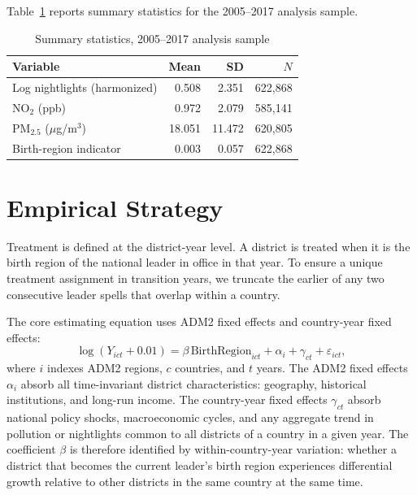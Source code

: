 \documentclass[9pt,twocolumn,twoside]{pnas-new}
\begin{document}
Table~\ref{tab:sumstats} reports summary statistics for the 2005--2017 analysis sample.

\begin{table}[t]
\centering
\caption{Summary statistics, 2005--2017 analysis sample}
\small
\begin{tabular*}{\columnwidth}{@{\extracolsep{\fill}}lrrr}
Variable & Mean & SD & $N$ \\
\midrule
Log nightlights (harmonized) & 0.508 & 2.351 & 622{,}868 \\
NO$_2$ (ppb) & 0.972 & 2.079 & 585{,}141 \\
PM$_{2.5}$ ($\mu$g/m$^3$) & 18.051 & 11.472 & 620{,}805 \\
Birth-region indicator & 0.003 & 0.057 & 622{,}868 \\
\bottomrule
\end{tabular*}
\label{tab:sumstats}
\end{table}

\section{Empirical Strategy}

Treatment is defined at the district-year level. A district is treated when it is the birth region of the national leader in office in that year. To ensure a unique treatment assignment in transition years, we truncate the earlier of any two consecutive leader spells that overlap within a country.

The core estimating equation uses ADM2 fixed effects and country-year fixed effects:
\[
\log(Y_{i c t} + 0.01) = \beta \, \text{BirthRegion}_{i c t} + \alpha_i + \gamma_{c t} + \varepsilon_{i c t},
\]
where $i$ indexes ADM2 regions, $c$ countries, and $t$ years. The ADM2 fixed effects $\alpha_i$ absorb all time-invariant district characteristics: geography, historical institutions, and long-run income. The country-year fixed effects $\gamma_{ct}$ absorb national policy shocks, macroeconomic cycles, and any aggregate trend in pollution or nightlights common to all districts of a country in a given year. The coefficient $\beta$ is therefore identified by within-country-year variation: whether a district that becomes the current leader's birth region experiences differential growth relative to other districts in the same country at the same time.
\end{document}
